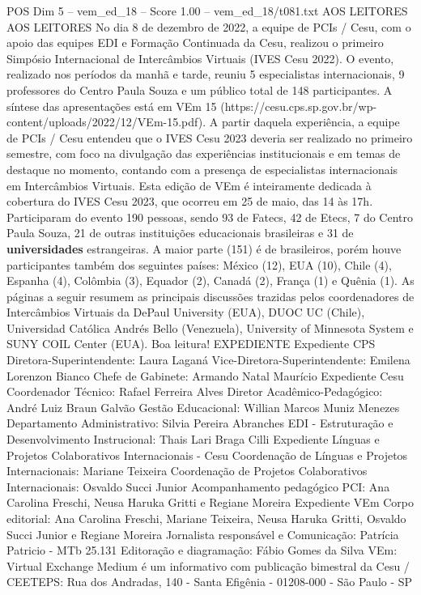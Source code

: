 \begin{textsample}{POS Dim 5 – vem\_ed\_18 – Score 1.00 – vem\_ed\_18/t081.txt}  \label{ex:f5_pos_042}
AOS LEITORES AOS LEITORES No dia 8 de dezembro de 2022, a equipe de PCIs / Cesu, com o apoio das equipes EDI e Formação Continuada da Cesu, realizou o primeiro Simpósio Internacional de Intercâmbios Virtuais (IVES Cesu 2022).
O evento, realizado nos períodos da manhã e tarde, reuniu 5 especialistas internacionais, 9 professores do Centro Paula Souza e um público total de 148 participantes.
A síntese das apresentações está em VEm 15 (https://cesu.cps.sp.gov.br/wp-content/uploads/2022/12/VEm-15.pdf).
A partir daquela experiência, a equipe de PCIs / Cesu entendeu que o IVES Cesu 2023 deveria ser realizado no primeiro semestre, com foco na divulgação das experiências institucionais e em temas de destaque no momento, contando com a presença de especialistas internacionais em Intercâmbios Virtuais.
Esta edição de VEm é inteiramente dedicada à cobertura do IVES Cesu 2023, que ocorreu em 25 de maio, das 14 às 17h.
Participaram do evento 190 pessoas, sendo 93 de Fatecs, 42 de Etecs, 7 do Centro Paula Souza, 21 de outras instituições educacionais brasileiras e 31 de \textbf{universidades} estrangeiras.
A maior parte (151) é de brasileiros, porém houve participantes também dos seguintes países: México (12), EUA (10), Chile (4), Espanha (4), Colômbia (3), Equador (2), Canadá (2), França (1) e Quênia (1).
As páginas a seguir resumem as principais discussões trazidas pelos coordenadores de Intercâmbios Virtuais da DePaul University (EUA), DUOC UC (Chile), Universidad Católica Andrés Bello (Venezuela), University of Minnesota System e SUNY COIL Center (EUA).
Boa leitura!
EXPEDIENTE Expediente CPS Diretora-Superintendente: Laura Laganá Vice-Diretora-Superintendente: Emilena Lorenzon Bianco Chefe de Gabinete: Armando Natal Maurício Expediente Cesu Coordenador Técnico: Rafael Ferreira Alves Diretor Acadêmico-Pedagógico: André Luiz Braun Galvão Gestão Educacional: Willian Marcos Muniz Menezes Departamento Administrativo: Silvia Pereira Abranches EDI - Estruturação e Desenvolvimento Instrucional: Thais Lari Braga Cilli Expediente Línguas e Projetos Colaborativos Internacionais - Cesu Coordenação de Línguas e Projetos Internacionais: Mariane Teixeira Coordenação de Projetos Colaborativos Internacionais: Osvaldo Succi Junior Acompanhamento pedagógico PCI: Ana Carolina Freschi, Neusa Haruka Gritti e Regiane Moreira Expediente VEm Corpo editorial: Ana Carolina Freschi, Mariane Teixeira, Neusa Haruka Gritti, Osvaldo Succi Junior e Regiane Moreira Jornalista responsável e Comunicação: Patrícia Patricio - MTb 25.131 Editoração e diagramação: Fábio Gomes da Silva VEm: Virtual Exchange Medium é um informativo com publicação bimestral da Cesu / CEETEPS: Rua dos Andradas, 140 - Santa Efigênia - 01208-000 - São Paulo - SP

\end{textsample}
